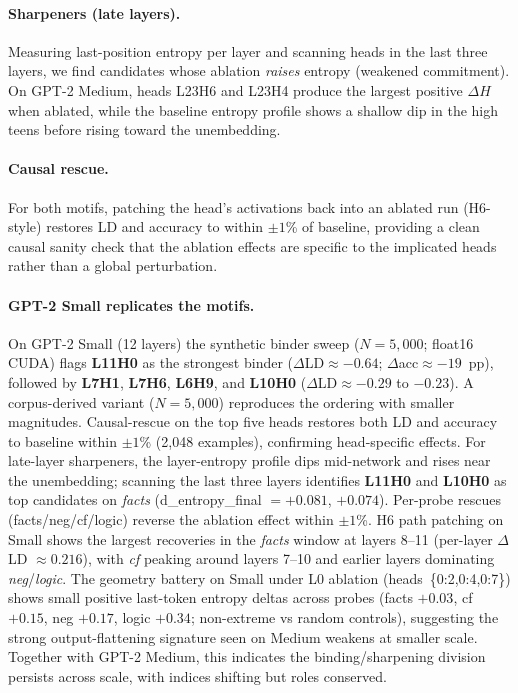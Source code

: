 \paragraph{Sharpeners (late layers).} Measuring last-position entropy per layer and scanning heads in the last three layers, we find candidates whose ablation \emph{raises} entropy (weakened commitment). On GPT-2 Medium, heads L23H6 and L23H4 produce the largest positive $\Delta H$ when ablated, while the baseline entropy profile shows a shallow dip in the high teens before rising toward the unembedding.

\paragraph{Causal rescue.} For both motifs, patching the head’s activations back into an ablated run (H6-style) restores LD and accuracy to within $\pm1$\% of baseline, providing a clean causal sanity check that the ablation effects are specific to the implicated heads rather than a global perturbation.

\paragraph{GPT-2 Small replicates the motifs.} On GPT-2 Small (12 layers) the synthetic binder sweep ($N{=}5{,}000$; float16 CUDA) flags \textbf{L11H0} as the strongest binder ($\Delta$LD$\approx-0.64$; $\Delta$acc$\approx-19$~pp), followed by \textbf{L7H1}, \textbf{L7H6}, \textbf{L6H9}, and \textbf{L10H0} ($\Delta$LD$\approx-0.29$ to $-0.23$). A corpus-derived variant ($N{=}5{,}000$) reproduces the ordering with smaller magnitudes. Causal-rescue on the top five heads restores both LD and accuracy to baseline within $\pm1$\% (2{,}048 examples), confirming head-specific effects. For late-layer sharpeners, the layer-entropy profile dips mid-network and rises near the unembedding; scanning the last three layers identifies \textbf{L11H0} and \textbf{L10H0} as top candidates on \emph{facts} (d\_entropy\_final $=+0.081$, $+0.074$). Per-probe rescues (facts/neg/cf/logic) reverse the ablation effect within $\pm1$\%. H6 path patching on Small shows the largest recoveries in the \emph{facts} window at layers 8--11 (per-layer $\Delta$LD $\approx 0.216$), with \emph{cf} peaking around layers 7--10 and earlier layers dominating \emph{neg}/\emph{logic}. The geometry battery on Small under L0 ablation (heads~\{0:2,0:4,0:7\}) shows small positive last-token entropy deltas across probes (facts $+0.03$, cf $+0.15$, neg $+0.17$, logic $+0.34$; non-extreme vs random controls), suggesting the strong output-flattening signature seen on Medium weakens at smaller scale. Together with GPT-2 Medium, this indicates the binding/sharpening division persists across scale, with indices shifting but roles conserved.

